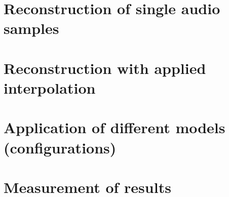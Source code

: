 \section{Reconstruction of single audio samples}

\section{Reconstruction with applied interpolation}

\section{Application of different models (configurations)}

\section{Measurement of results}